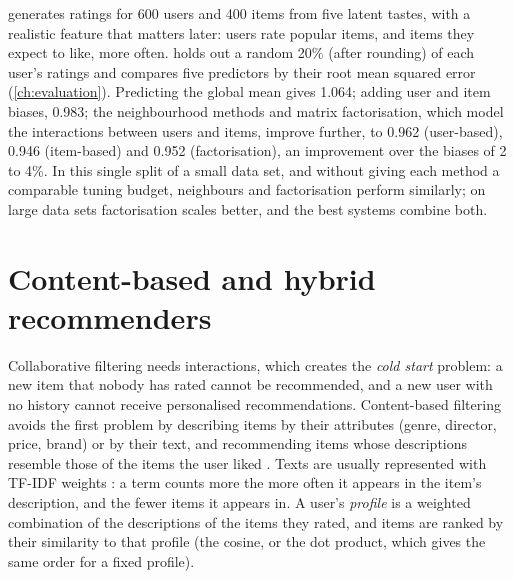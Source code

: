  generates ratings for 600 users and 400 items from five latent tastes, with a realistic feature that
matters later: users rate popular items, and items they expect to like, more often.  holds out a random 20\%
(after rounding) of each user's ratings and compares five predictors by their root mean squared error (\cref{ch:evaluation}). Predicting
the global mean gives 1.064; adding user and item biases, 0.983; the neighbourhood methods and matrix
factorisation, which model the interactions between users and items, improve further, to 0.962 (user-based),
0.946 (item-based) and 0.952 (factorisation), an improvement over the biases of 2 to 4\%. In this single split
of a small data set, and without giving each method a comparable tuning budget, neighbours and factorisation perform similarly; on large data sets factorisation scales better,
and the best systems combine both.

\section{Content-based and hybrid recommenders}\label{sec:contentbased}

Collaborative filtering needs interactions, which creates the \emph{cold start} problem: a new item that nobody has
rated cannot be recommended, and a new user with no history cannot receive personalised recommendations. Content-based
filtering avoids the first problem by describing items by their attributes (genre, director, price, brand) or by their
text, and recommending items whose descriptions resemble those of the items the user liked
\citep{pazzani2007content}. Texts are usually represented with TF-IDF weights \citep{salton1988term}: a term
counts more the more often it appears in the item's description, and the fewer items it appears in. A user's
\emph{profile} is a weighted combination of the descriptions of the items they rated, and items are ranked by their similarity to that
profile (the cosine, or the dot product, which gives the same order for a fixed profile).

